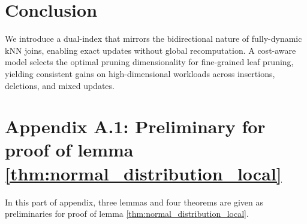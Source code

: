 \section{Conclusion} \label{sec:conclusion}
We introduce a dual-index that mirrors the bidirectional nature of fully-dynamic kNN joins, enabling exact updates without global recomputation. A cost-aware model selects the optimal pruning dimensionality for fine-grained leaf pruning, yielding consistent gains on high-dimensional workloads across insertions, deletions, and mixed updates.
\appendix
\section*{Appendix A.1: Preliminary for proof of lemma \ref{thm:normal_distribution_local}}
In this part of appendix, three lemmas and four theorems are given as preliminaries for proof of lemma \ref{thm:normal_distribution_local}.
